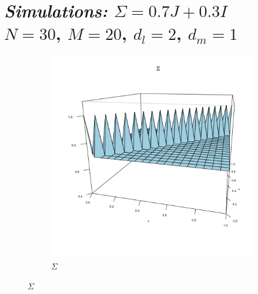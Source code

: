 \documentclass[12pt]{article}
\theoremstyle{definition}
\begin{document}
 



 
\section{\emph{Simulations: }$\Sigma = 0.7J + 0.3I$\\
$N = 30$, $M=20$, $d_l = 2$, $d_m= 1$}


  \begin{center}
\begin{figure}[H]
 \begin{subfigure}{.48\textwidth}
 \includegraphics{img/compound-symmetry-true-covariance}
 \caption{$\Sigma$ }
 \end{subfigure}
  

\end{figure}
\end{center}
\end{document}
